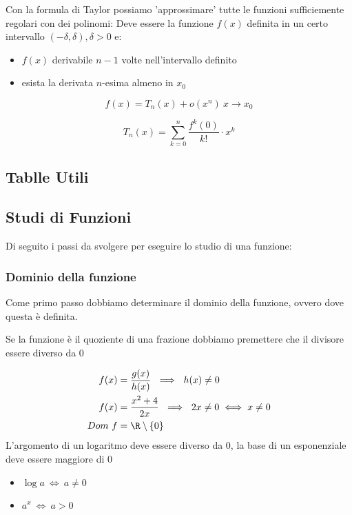 \documentclass[../analisi.tex]{subfiles}
\begin{document}
\begin{defn}
	Con la formula di Taylor possiamo 'approssimare'  tutte
	le funzioni sufficiemente regolari con dei polinomi:
	Deve essere la funzione $ f ( x ) $ definita in un certo intervallo $ 
	( -\delta, \delta ), \delta > 0 $ e:
	\begin{itemize}
		\item $ f(x) $ derivabile $ n-1 $ volte nell'intervallo definito
		\item esista la derivata $ n $-esima almeno in $ x_0 $
	\end{itemize}

	\begin{equation}
		f(x) = T_n (x) + o (x^n)\ x \to x_0 
	\end{equation}

	\begin{equation}
		T_n (x) = \sum^{n}_{k=0} \frac{f^{k} (0)}{k!} \cdot x^k
	\end{equation}
\end{defn}





\subsection{Tablle Utili}%
\label{sub:tablle_utili}


\clearpage

\clearpage


\subsection{Studi di Funzioni}%
\label{sub:studi_di_funzioni} 
Di seguito i passi da svolgere per eseguire lo studio di una funzione:
\subsubsection{Dominio della funzione}
Come primo passo dobbiamo determinare il dominio della funzione,
ovvero dove questa è definita.

\begin{esem}
Se la funzione è il quoziente di una frazione dobbiamo premettere che il divisore
 essere diverso da 0

\begin{equation}
	\begin{aligned}
		f ( x ) &= \frac{g(x)}{h(x)}\ \implies\ h(x) \neq 0\\
		f ( x ) &= \frac{x^2 + 4}{2x}\ \implies\ 2x \neq 0 \iff x \neq 0\\ 
		Dom\ f 	&= \R \setminus\{0\}
	\end{aligned}
\end{equation}
L'argomento di un logaritmo deve essere diverso da 0, la base di un esponenziale 
deve essere maggiore di 0

\begin{itemize}
	\item $ \log a\ \iff\ a \neq 0 $ 
	\item $ a^x\ \iff\ a > 0$
\end{itemize}
\end{esem}
\end{document}
